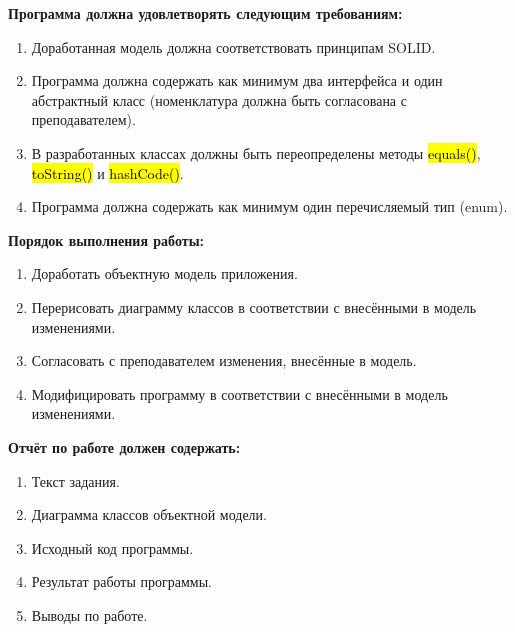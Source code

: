 \newcommand*{\codehl}[1]{\textcolor{fg-pink}{\hl{#1}}}
%
\textbf{Программа должна удовлетворять следующим требованиям:}
\begin{enumerate}
\item  Доработанная модель должна соответствовать принципам SOLID.
\item  Программа должна содержать как минимум два интерфейса и один абстрактный класс (номенклатура должна быть согласована с преподавателем).
\item  В разработанных классах должны быть переопределены методы \codehl{equals()}, \codehl{toString()} и \codehl{hashCode()}.
\item  Программа должна содержать как минимум один перечисляемый тип (enum).
\end{enumerate}

\textbf{Порядок выполнения работы:}
\begin{enumerate}
    \item  Доработать объектную модель приложения.
    \item  Перерисовать диаграмму классов в соответствии с внесёнными в модель изменениями.
    \item  Согласовать с преподавателем изменения, внесённые в модель.
    \item  Модифицировать программу в соответствии с внесёнными в модель изменениями.
\end{enumerate}

\textbf{Отчёт по работе должен содержать:}
\begin{enumerate}
\item  Текст задания.
\item  Диаграмма классов объектной модели.
\item  Исходный код программы.
\item  Результат работы программы.
\item  Выводы по работе.
\end{enumerate}